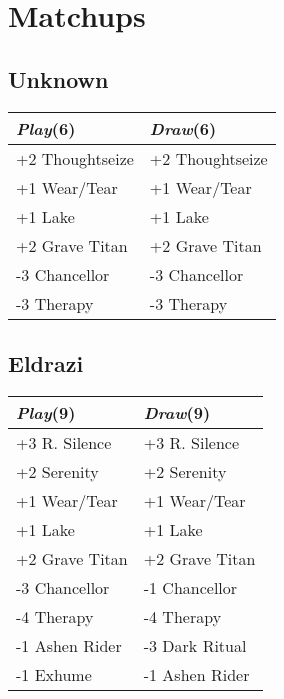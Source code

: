 \documentclass{article}
\renewcommand *\contentsname{Contents}
\begin{document}
\section*{Matchups}
\begin{multicols}{2}
\subsection*{Unknown}
\begin{center}
\begin{tabular}{| l | l |}
\hline
\textit{Play}(6) & \textit{Draw}(6) \\
\hline
\cellcolor[HTML]{BBDDBB}\small{+2 Thoughtseize} & \cellcolor[HTML]{BBDDBB}\small{+2 Thoughtseize}\\
\cellcolor[HTML]{BBDDBB}\small{+1 Wear/Tear} & \cellcolor[HTML]{BBDDBB}\small{+1 Wear/Tear}\\
\cellcolor[HTML]{BBDDBB}\small{+1 Lake} & \cellcolor[HTML]{BBDDBB}\small{+1 Lake}\\
\cellcolor[HTML]{BBDDBB}\small{+2 Grave Titan} & \cellcolor[HTML]{BBDDBB}\small{+2 Grave Titan}\\
\cellcolor[HTML]{DDBBBB}\small{-3 Chancellor} & \cellcolor[HTML]{DDBBBB}\small{-3 Chancellor}\\
\cellcolor[HTML]{DDBBBB}\small{-3 Therapy} & \cellcolor[HTML]{DDBBBB}\small{-3 Therapy}\\
\hline
\end{tabular}
\end{center}
\subsection*{Eldrazi}
\begin{center}
\begin{tabular}{| l | l |}
\hline
\textit{Play}(9) & \textit{Draw}(9) \\
\hline
\cellcolor[HTML]{BBDDBB}\small{+3 R. Silence} & \cellcolor[HTML]{BBDDBB}\small{+3 R. Silence}\\
\cellcolor[HTML]{BBDDBB}\small{+2 Serenity} & \cellcolor[HTML]{BBDDBB}\small{+2 Serenity}\\
\cellcolor[HTML]{BBDDBB}\small{+1 Wear/Tear} & \cellcolor[HTML]{BBDDBB}\small{+1 Wear/Tear}\\
\cellcolor[HTML]{BBDDBB}\small{+1 Lake} & \cellcolor[HTML]{BBDDBB}\small{+1 Lake}\\
\cellcolor[HTML]{BBDDBB}\small{+2 Grave Titan} & \cellcolor[HTML]{BBDDBB}\small{+2 Grave Titan}\\
\cellcolor[HTML]{DDBBBB}\small{-3 Chancellor} & \cellcolor[HTML]{DDBBBB}\small{-1 Chancellor}\\
\cellcolor[HTML]{DDBBBB}\small{-4 Therapy} & \cellcolor[HTML]{DDBBBB}\small{-4 Therapy}\\
\cellcolor[HTML]{DDBBBB}\small{-1 Ashen Rider} & \cellcolor[HTML]{DDBBBB}\small{-3 Dark Ritual}\\
\cellcolor[HTML]{DDBBBB}\small{-1 Exhume} & \cellcolor[HTML]{DDBBBB}\small{-1 Ashen Rider}\\
\hline
\end{tabular}
\end{center}

\end{multicols}
\end{document}
